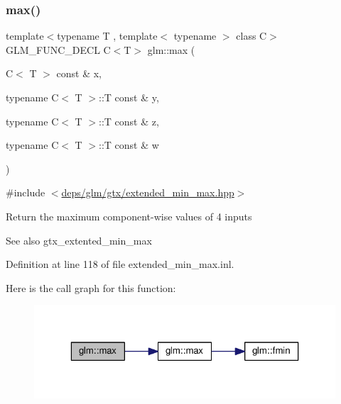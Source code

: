 \subsubsection{\texorpdfstring{max()}{max()}\hspace{0.1cm}{\footnotesize\ttfamily [5/6]}}
{\footnotesize\ttfamily template$<$typename T , template$<$ typename $>$ class C$>$ \\
G\+L\+M\+\_\+\+F\+U\+N\+C\+\_\+\+D\+E\+CL C$<$T$>$ glm\+::max (\begin{DoxyParamCaption}\item[{C$<$ T $>$ const \&}]{x,  }\item[{typename C$<$ T $>$\+::T const \&}]{y,  }\item[{typename C$<$ T $>$\+::T const \&}]{z,  }\item[{typename C$<$ T $>$\+::T const \&}]{w }\end{DoxyParamCaption})}



{\ttfamily \#include $<$\hyperlink{extended__min__max_8hpp}{deps/glm/gtx/extended\+\_\+min\+\_\+max.\+hpp}$>$}

Return the maximum component-\/wise values of 4 inputs \begin{DoxySeeAlso}{See also}
gtx\+\_\+extented\+\_\+min\+\_\+max 
\end{DoxySeeAlso}


Definition at line 118 of file extended\+\_\+min\+\_\+max.\+inl.

Here is the call graph for this function\+:
\nopagebreak
\begin{figure}[H]
\begin{center}
\leavevmode
\includegraphics[width=323pt]{df/d72/group__gtx__extended__min__max_ga7cca8b53cfda402040494cdf40fbdf4a_cgraph}
\end{center}
\end{figure}
\mbox{\label{group__gtx__extended__min__max_gaacffbc466c2d08c140b181e7fd8a4858}} 

